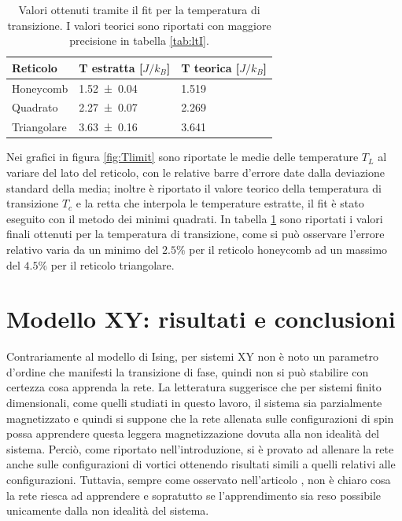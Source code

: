 \documentclass{article}
\begin{document}
\begin{table}[!ht]
\begin{center}
\begin{tabular}{lll}
\toprule
Reticolo & T estratta [$J/k_B$] & T teorica [$J/k_B$] \\
\midrule
Honeycomb & \num{1.52 \pm 0.04} & \num{1.519} \\
Quadrato & \num{2.27 \pm 0.07} & \num{2.269} \\
Triangolare & \num{3.63 \pm 0.16} & \num{3.641} \\
\bottomrule
\end{tabular}
\end{center}
\caption{Valori ottenuti tramite il fit per la temperatura di transizione. I valori teorici sono riportati con maggiore precisione in tabella \ref{tab:ltI}.}
\label{tab:Tising}
\end{table}

Nei grafici in figura \ref{fig:Tlimit} sono riportate le medie delle temperature $T_L$ al variare del lato del reticolo, con le relative barre d'errore date dalla deviazione standard della media; inoltre è riportato il valore teorico della temperatura di transizione $T_c$ e la retta che interpola le temperature estratte, il fit è stato eseguito con il metodo dei minimi quadrati.
In tabella \ref{tab:Tising} sono riportati i valori finali ottenuti per la temperatura di transizione, come si può osservare l'errore relativo varia da un minimo del $2.5\%$ per il reticolo honeycomb ad un massimo del $4.5\%$ per il reticolo triangolare.


\section{Modello XY: risultati e conclusioni}
Contrariamente al modello di Ising, per sistemi XY non è noto un parametro d'ordine che manifesti la transizione di fase, quindi non si può stabilire con certezza cosa apprenda la rete.
La letteratura \cite{melko} suggerisce che per sistemi finito dimensionali, come quelli studiati in questo lavoro, il sistema sia parzialmente magnetizzato e quindi si suppone che la rete allenata sulle configurazioni di spin possa apprendere questa leggera magnetizzazione dovuta alla non idealità del sistema.
Perciò, come riportato nell'introduzione, si è provato ad allenare la rete anche sulle configurazioni di vortici ottenendo risultati simili a quelli relativi alle configurazioni.
Tuttavia, sempre come osservato nell'articolo \cite{melko}, non è chiaro cosa la rete riesca ad apprendere e sopratutto se l'apprendimento sia reso possibile unicamente dalla non idealità del sistema.
\end{document}
